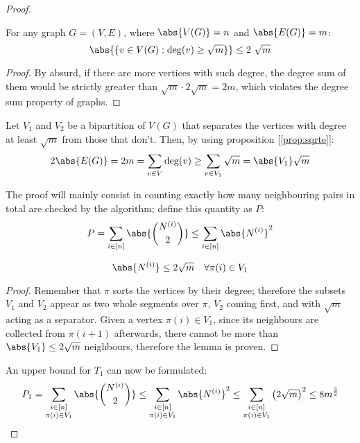 \begin{proof}

    \begin{proposition}\label{prop:sqrte}
        For any graph $G = (V, E)$, where $\abs{V(G)} = n$ and $\abs{E(G)} = m$:
        \[
            \abs{\{v \in V(G) : \deg(v) \geq \sqrt{m}\}} \leq 2\ \sqrt{m}
        \]
    \end{proposition}
    \begin{proof}
        By absurd, if there are more vertices with such degree, the degree sum of them would be strictly greater than $\sqrt{m} \cdot 2 \sqrt{m} = 2 m$, which violates the degree sum property of graphs.
    \end{proof}
    
    Let $V_1$ and $V_2$ be a bipartition of $V(G)$ that separates the vertices with degree at least $\sqrt{m}$ from those that don't. Then, by using proposition [\ref{prop:sqrte}]:
    \[
        2 \abs{E(G)} = 2 m = \sum_{v \in V} \deg(v) \geq \sum_{v \in V_1} \sqrt{m} = \abs{V_1} \sqrt{m}
    \]

    The proof will mainly consist in counting exactly how many neighbouring pairs in total are checked by the algorithm; define this quantity as $P$:
    \[
        P = \sum_{i \in [n]} \abs{\binom{N^{(i)}}{2}} \leq \sum_{i \in [n]} \abs{N^{(i)}}^2
    \]

    \begin{lemma}\label{lem:triangles-1}

        \[
            \abs{N^{(i)}} \leq 2 \sqrt{m} \quad \forall \pi(i) \in V_1
        \]
    \end{lemma}
    \begin{proof}
        Remember that $\pi$ sorts the vertices by their degree; therefore the subsets $V_1$ and $V_2$ appear as two whole segments over $\pi$, $V_2$ coming first, and with $\sqrt{m}$ acting as a separator. Given a vertex $\pi(i) \in V_1$, since its neighbours are collected from $\pi(i + 1)$ afterwards, there cannot be more than $\abs{V_1} \leq 2 \sqrt{m}$ neighbours, therefore the lemma is proven.
    \end{proof}

    An upper bound for $T_1$ can now be formulated:
    \begin{equation}\label{eq:triangles-tv1}
        P_1 = \sum_{\substack{i \in [n] \\ \pi(i) \in V_1}} \abs{\binom{N^{(i)}}{2}} \leq \sum_{\substack{i \in [n] \\ \pi(i) \in V_1}} \abs{N^{(i)}}^2 \leq \sum_{\substack{i \in [n] \\ \pi(i) \in V_1}} \left( 2 \sqrt{m} \right)^2 \leq 8 m^{\frac{3}{2}}
    \end{equation}


\end{proof}
